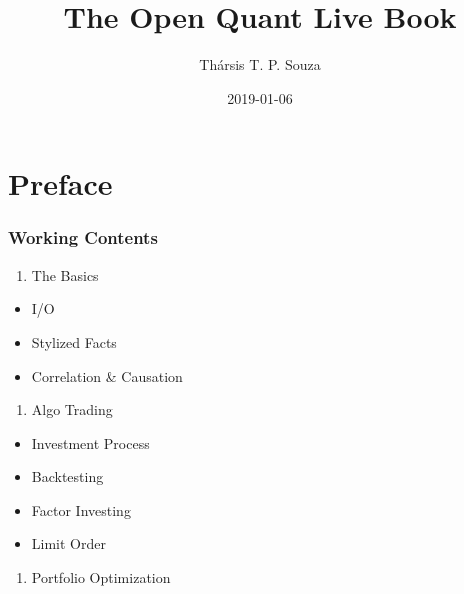 \documentclass[]{book}
\title{The Open Quant Live Book}
\author{Thársis T. P. Souza}
\date{2019-01-06}
\providecommand{\tightlist}{%
  \setlength{\itemsep}{0pt}\setlength{\parskip}{0pt}}
\theoremstyle{definition}
\theoremstyle{definition}
\theoremstyle{definition}
\theoremstyle{remark}
\begin{document}


\maketitle

{
\hypersetup{linkcolor=}
\setcounter{tocdepth}{2}
\tableofcontents
}
\newcommand{\independent}{\perp\!\!\!\!\perp}

\DeclarePairedDelimiter\ceil{\lceil}{\rceil}
\DeclarePairedDelimiter\floor{\lfloor}{\rfloor}

\chapter*{Preface}\label{preface}


\subsection*{Working Contents}\label{working-contents}


\begin{enumerate}
\def\labelenumi{\arabic{enumi}.}
\tightlist
\item
  The Basics
\end{enumerate}

\begin{itemize}
\tightlist
\item
  I/O
\item
  Stylized Facts
\item
  Correlation \& Causation
\end{itemize}

\begin{enumerate}
\def\labelenumi{\arabic{enumi}.}
\setcounter{enumi}{1}
\tightlist
\item
  Algo Trading
\end{enumerate}

\begin{itemize}
\tightlist
\item
  Investment Process
\item
  Backtesting
\item
  Factor Investing
\item
  Limit Order
\end{itemize}

\begin{enumerate}
\def\labelenumi{\arabic{enumi}.}
\setcounter{enumi}{2}
\tightlist
\item
  Portfolio Optimization
\end{enumerate}
\end{document}
